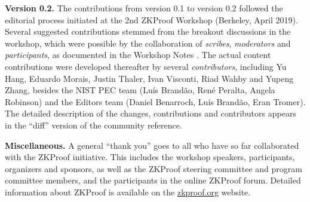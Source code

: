 \textbf{Version 0.2.}
	The contributions from version 0.1 to version 0.2 followed the editorial process initiated at the 2nd ZKProof Workshop (Berkeley, April 2019).
	Several suggested contributions stemmed from the breakout discussions in the workshop, which were possible by the collaboration of \emph{scribes}, \emph{moderators} and \emph{participants}, as documented in the Workshop Notes \cite{2019:zkproof:notes-2nd-workshop}.
	The actual content contributions were developed thereafter by several \emph{contributors}, including Yu Hang, Eduardo Morais, Justin Thaler, Ivan Visconti, Riad Wahby and Yupeng Zhang,
besides the NIST PEC team (Luís Brandão, René Peralta, Angela Robinson) 
and the Editors team (Daniel Benarroch, Luís Brandão, Eran Tromer).
	The detailed description of the changes, contributions and contributors appears in the ``diff'' version of the community reference.


\textbf{Miscellaneous.}
	A general ``thank you'' goes to all who have so far collaborated with the ZKProof initiative.
	This includes the workshop speakers, participants, organizers and sponsors, as well as the ZKProof steering committee and program committee members, and the participants in the online ZKProof forum.
	Detailed information about ZKProof is available on the \href{https://zkproof.org/}{zkproof.org} website.
